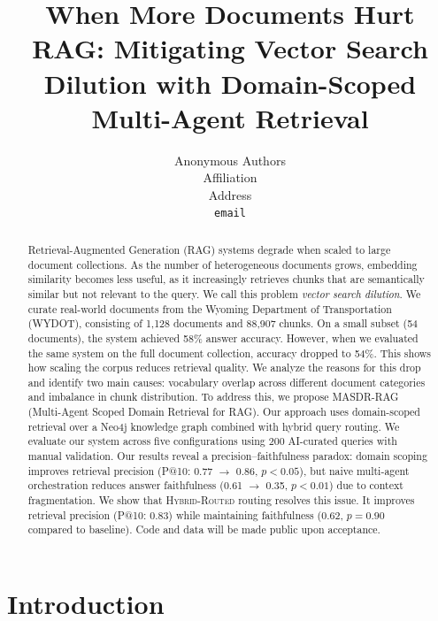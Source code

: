 \documentclass{article}
\title{When More Documents Hurt RAG: Mitigating Vector Search Dilution with Domain-Scoped Multi-Agent Retrieval}
\author{Anonymous Authors \\
Affiliation \\
Address \\
\texttt{email}
}
\newcommand{\systemname}{\textsc{MASDR-RAG}}
\newcommand{\hybridname}{\textsc{Hybrid-Routed}}
\newcommand{\numChunks}{88{,}907}
\newcommand{\numQueries}{200}
\begin{document}
\maketitle

\begin{abstract}
Retrieval-Augmented Generation (RAG) systems degrade when scaled to large document collections. As the number of heterogeneous documents grows, embedding similarity becomes less useful, as it increasingly retrieves chunks that are semantically similar but not relevant to the query. We call this problem \textit{vector search dilution}.
We curate real-world documents from the Wyoming Department of Transportation (WYDOT), consisting of 1,128 documents and \numChunks{} chunks. On a small subset (54 documents), the system achieved 58\% answer accuracy. However, when we evaluated the same system on the full document collection, accuracy dropped to 54\%. This shows how scaling the corpus reduces retrieval quality. We analyze the reasons for this drop and identify two main causes: vocabulary overlap across different document categories and imbalance in chunk distribution. To address this, we propose \systemname{} (Multi-Agent Scoped Domain Retrieval for RAG). Our approach uses domain-scoped retrieval over a Neo4j knowledge graph combined with hybrid query routing. We evaluate our system across five configurations using \numQueries{} AI-curated queries with manual validation. Our results reveal a precision--faithfulness paradox: domain scoping improves retrieval precision (P@10: 0.77 $\rightarrow$ 0.86, $p < 0.05$), but naive multi-agent orchestration reduces answer faithfulness (0.61 $\rightarrow$ 0.35, $p < 0.01$) due to context fragmentation. We show that \hybridname{} routing resolves this issue. It improves retrieval precision (P@10: 0.83) while maintaining faithfulness (0.62, $p = 0.90$ compared to baseline). Code and data will be made public upon acceptance.

\end{abstract}

\section{Introduction}
\label{sec:introduction}
\end{document}
